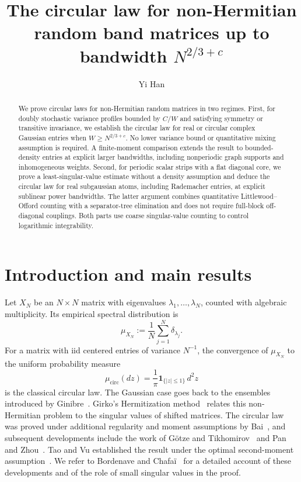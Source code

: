 \documentclass[11pt,reqno]{amsart}
\title[The circular law for non-Hermitian random band matrices]{The circular law for non-Hermitian random band matrices up to bandwidth $N^{2/3+c}$}
\author{Yi Han}
\date{}
\numberwithin{equation}{section}
\theoremstyle{plain}
\theoremstyle{definition}
\theoremstyle{remark}
\begin{document}
\begin{abstract}
We prove circular laws for non-Hermitian random matrices in two regimes.
First, for doubly stochastic variance profiles bounded by $C/W$ and
satisfying symmetry or transitive invariance, we establish the circular
law for real or circular complex Gaussian entries when
$W\ge N^{2/3+c}$. No lower variance bound or quantitative mixing
assumption is required. A finite-moment comparison extends the result
to bounded-density entries at explicit larger bandwidths, including
nonperiodic graph supports and inhomogeneous weights. Second, for periodic
scalar strips with a flat diagonal core, we prove a least-singular-value
estimate without a density assumption and deduce the circular law for
real subgaussian atoms, including Rademacher entries, at explicit
sublinear power bandwidths. The latter argument combines quantitative
Littlewood--Offord counting with a separator-tree elimination and does
not require full-block off-diagonal couplings. Both parts use coarse
singular-value counting to control logarithmic integrability.
\end{abstract}
\maketitle
\section{Introduction and main results}

Let $X_N$ be an $N\times N$ matrix with eigenvalues
$\lambda_1,\ldots,\lambda_N$, counted with algebraic multiplicity.
Its empirical spectral distribution is
\[
 \mu_{X_N}:=\frac1N\sum_{j=1}^N\delta_{\lambda_j}.
\]
For a matrix with iid centered entries of variance $N^{-1}$, the
convergence of $\mu_{X_N}$ to the uniform probability measure
\[
 \mu_{\mathrm{circ}}(dz)=\frac1\pi\mathbf1_{\{|z|\le1\}}\,d^2z
\]
is the classical circular law. The Gaussian case goes back to the
ensembles introduced by Ginibre~\cite{ginibre1965}. Girko's
Hermitization method~\cite{girko1985} relates this non-Hermitian problem
to the singular values of shifted matrices. The circular law was proved
under additional regularity and moment assumptions by Bai~\cite{bai1997},
and subsequent developments include the work of
G\"otze and Tikhomirov~\cite{gotze2010} and Pan and Zhou~\cite{pan2010}.
Tao and Vu established the result under the optimal second-moment
assumption~\cite{WOS:000281425000010}. We refer to Bordenave and
Chafa\"i~\cite{bordenave2012} for a detailed account of these developments
and of the role of small singular values in the proof.
\end{document}
